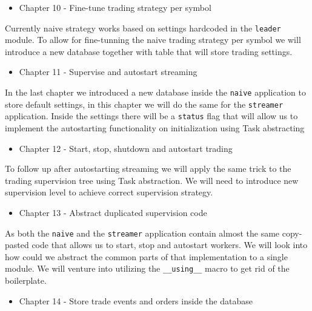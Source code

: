 \documentclass[
  oneside]{book}
\providecommand{\tightlist}{%
  \setlength{\itemsep}{0pt}\setlength{\parskip}{0pt}}
\begin{document}
\begin{itemize}
\tightlist
\item
  Chapter 10 - Fine-tune trading strategy per symbol
\end{itemize}

Currently naive strategy works based on settings hardcoded in the \texttt{leader} module. To allow for fine-tunning the naive trading strategy per symbol we will introduce a new database together with table that will store trading settings.

\begin{itemize}
\tightlist
\item
  Chapter 11 - Supervise and autostart streaming
\end{itemize}

In the last chapter we introduced a new database inside the \texttt{naive} application to store default settings, in this chapter we will do the same for the \texttt{streamer} application. Inside the settings there will be a \texttt{status} flag that will allow us to implement the autostarting functionality on initialization using Task abstracting

\begin{itemize}
\tightlist
\item
  Chapter 12 - Start, stop, shutdown and autostart trading
\end{itemize}

To follow up after autostarting streaming we will apply the same trick to the trading supervision tree using Task abstraction. We will need to introduce new supervision level to achieve correct supervision strategy.

\begin{itemize}
\tightlist
\item
  Chapter 13 - Abstract duplicated supervision code
\end{itemize}

As both the \texttt{naive} and the \texttt{streamer} application contain almost the same copy-pasted code that allows us to start, stop and autostart workers. We will look into how could we abstract the common parts of that implementation to a single module. We will venture into utilizing the \texttt{\_\_using\_\_} macro to get rid of the boilerplate.

\begin{itemize}
\tightlist
\item
  Chapter 14 - Store trade events and orders inside the database
\end{itemize}
\end{document}
